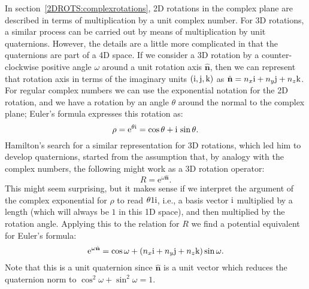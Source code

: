 In section~\ref{2DROTS:complexrotations}, 2D rotations in the complex plane are described in terms of multiplication by a unit complex number.  For 3D rotations, a similar process can be carried out by means of multiplication by unit quaternions.  However, the details are a little more complicated in that the quaternions are part of a 4D space. If we consider a 3D rotation by a counter-clockwise positive angle $\omega$ around a unit rotation axis $\hat{\mathbf{n}}$, then we can represent that rotation axis in terms of the imaginary units $(\mathrm{i}, \mathrm{j}, \mathrm{k})$ as $\hat{\mathbf{n}}=n_x\mathrm{i}+n_y \mathrm{j}+n_z \mathrm{k}$.  For regular complex numbers we can use the exponential notation for the 2D rotation, and we have a rotation by an angle $\theta$ around the normal to the complex plane; Euler's formula expresses this rotation as:
\[
	\rho = \mathrm{e}^{\theta\mathrm{i}} = \cos\theta+\mathrm{i}\,\sin\theta.
\]
Hamilton's search for a similar representation for 3D rotations, which led him to develop quaternions, started from the assumption that, by analogy with the complex numbers, the following might work as a 3D rotation operator:
\[
	R = \mathrm{e}^{\omega \hat{\mathbf{n}}}.
\]
This might seem surprising, but it makes sense if we interpret the argument of the complex exponential for $\rho$ to read $\theta 1 \mathrm{i}$, i.e., a basis vector $\mathrm{i}$ multiplied by a length (which will always be $1$ in this 1D space), and then multiplied by the rotation angle.  Applying this to the relation for $R$ we find a potential equivalent for Euler's formula:
\[
	\mathrm{e}^{\omega \hat{\mathbf{n}}} = \cos\omega+ (n_x\mathrm{i}+n_y \mathrm{j}+n_z \mathrm{k})\sin\omega.
\]
Note that this is a unit quaternion since $\hat{\mathbf{n}}$ is a unit vector which reduces the quaternion norm to $\cos^2\omega+\sin^2\omega=1$.

